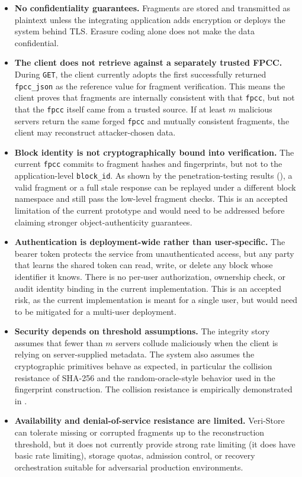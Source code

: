 \documentclass[../veristore_security_model.tex]{subfiles}
\begin{document}
\begin{itemize}
    \item \textbf{No confidentiality guarantees.} Fragments are stored and transmitted as plaintext unless the integrating application adds encryption or deploys the system behind TLS. Erasure coding alone does not make the data confidential.

    \item \textbf{The client does not retrieve against a separately trusted FPCC.} During \texttt{GET}, the client currently adopts the first successfully returned \texttt{fpcc\_json} as the reference value for fragment verification. This means the client proves that fragments are internally consistent with that \texttt{fpcc}, but not that the \texttt{fpcc} itself came from a trusted source. If at least $m$ malicious servers return the same forged \texttt{fpcc} and mutually consistent fragments, the client may reconstruct attacker-chosen data.

    \item \textbf{Block identity is not cryptographically bound into verification.} The current \texttt{fpcc} commits to fragment hashes and fingerprints, but not to the application-level \texttt{block\_id}. As shown by the penetration-testing results (), a valid fragment or a full stale response can be replayed under a different block namespace and still pass the low-level fragment checks. This is an accepted limitation of the current prototype and would need to be addressed before claiming stronger object-authenticity guarantees.

    \item \textbf{Authentication is deployment-wide rather than user-specific.} The bearer token protects the service from unauthenticated access, but any party that learns the shared token can read, write, or delete any block whose identifier it knows. There is no per-user authorization, ownership check, or audit identity binding in the current implementation. This is an accepted risk, as the current implementation is meant for a single user, but would need to be mitigated for a multi-user deployment.

    \item \textbf{Security depends on threshold assumptions.} The integrity story assumes that fewer than $m$ servers collude maliciously when the client is relying on server-supplied metadata. The system also assumes the cryptographic primitives behave as expected, in particular the collision resistance of SHA-256 and the random-oracle-style behavior used in the fingerprint construction. The collision resistance is empirically demonstrated in .

    \item \textbf{Availability and denial-of-service resistance are limited.} Veri-Store can tolerate missing or corrupted fragments up to the reconstruction threshold, but it does not currently provide strong rate limiting (it does have basic rate limiting), storage quotas, admission control, or recovery orchestration suitable for adversarial production environments.
\end{itemize}
\end{document}
